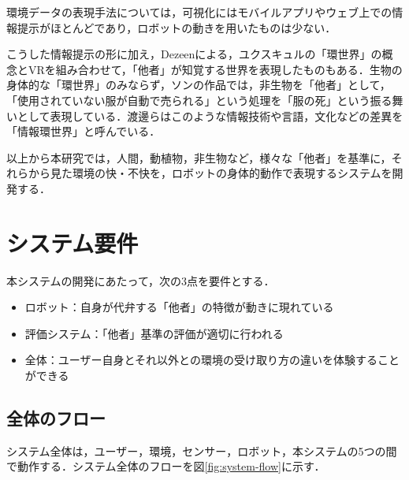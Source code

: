 \documentclass[paper=a4paper,jafontsize=9pt,head_space=15mm,gutter=20mm,
twocolumn,number_of_lines=49, line_length=26zw]{myuarticle}
\begin{document}
環境データの表現手法については，可視化にはモバイルアプリやウェブ上での情報提示がほとんどであり\cite{Saini-2020-IndoorAirQualityMonitoring}，ロボットの動きを用いたものは少ない．

こうした情報提示の形に加え，Dezeen\cite{-2015-VirtualRealityPresentsForest}による，ユクスキュルの「環世界」の概念とVRを組み合わせて，「他者」が知覚する世界を表現したものもある．生物の身体的な「環世界」のみならず，ソン\cite{--ソンヨン}の作品では，非生物を「他者」として，「使用されていない服が自動で売られる」という処理を「服の死」という振る舞いとして表現している．渡邊ら\cite{渡邉-2019-情報環世}はこのような情報技術や言語，文化などの差異を「情報環世界」と呼んでいる．

以上から本研究では，人間，動植物，非生物など，様々な「他者」を基準に，それらから見た環境の快・不快を，ロボットの身体的動作で表現するシステムを開発する．

\section{システム要件}
本システムの開発にあたって，次の3点を要件とする．
\begin{itemize}
  \item ロボット：自身が代弁する「他者」の特徴が動きに現れている
  \item 評価システム：「他者」基準の評価が適切に行われる
  \item 全体：ユーザー自身とそれ以外との環境の受け取り方の違いを体験することができる
\end{itemize}

\subsection{全体のフロー}
システム全体は，ユーザー，環境，センサー，ロボット，本システムの5つの間で動作する．システム全体のフローを図\ref{fig:system-flow}に示す．
\end{document}
